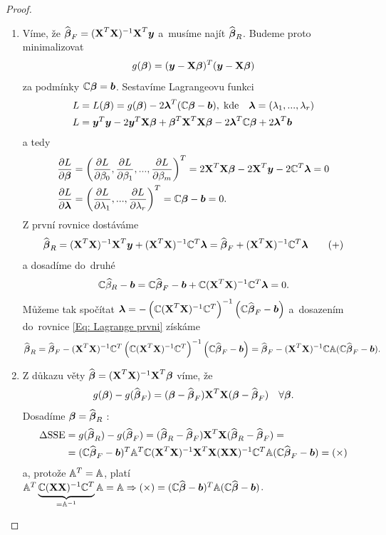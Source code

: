 \begin{proof}
\begin{enumerate}
\item
Víme, že $\wbetab_F = \xtx \X^T \yb$ a~musíme najít $\wbetab_R$. Budeme proto minimalizovat
 $$
g(\betab) = (\yb - \X \betab)^T(\yb - \X \betab)
 $$
za podmínky $\C \betab = \bb$. Sestavíme Lagrangeovu funkci
\begin{align*}
L & = L(\betab) = g(\betab) - 2 \lambdab^T(\C \betab - \bb), \; \text{kde} \quad \lambdab = (\lambda_1,..., \lambda_r) \\
L & = \yb^T \yb - 2 \yb^T \X \betab + \betab^T \X^T \X \betab - 2 \lambdab^T \C \betab + 2 \lambdab^T \bb
\end{align*}
a tedy
\begin{align*}
\frac{\partial L}{\partial \betab} & = \left(\parcialni{L}{\beta_0}, \parcialni{L}{\beta_1},..., \parcialni{L}{\beta_m} \right)^T = 2 \X^T \X \betab - 2 \X^T \yb - 2 \C^T \lambdab = 0 \\
\parcialni{L}{\lambdab} & = \left(\parcialni{L}{\lambda_1},..., \parcialni{L}{\lambda_r} \right)^T = \C \betab - \bb = 0.
\end{align*}
Z první rovnice dostáváme
\begin{equation}
\wbetab_R = \xtx \X^T \yb + \xtx \C^T \lambdab = \wbetab_F + \xtx \C^T \lambdab \tag{+} \label{Eq: Lagrange prvni}
\end{equation}
a dosadíme do~druhé
 $$
\C \wbeta_R - \bb = \C \wbetab_F - \bb + \C \xtx \C^T \lambdab = 0.
 $$
Můžeme tak spočítat $\lambdab = -\left(\C \xtx \C^T\right)^{-1} \left(\C \wbetab_F - \bb \right)$ a~dosazením do~rovnice \eqref{Eq: Lagrange prvni} získáme
 $$
\wbetab_R = \wbetab_F - \xtx \C^T \left(\C \xtx \C^T \right)^{-1} \left(\C \wbetab_F - \bb \right) = \wbetab_F - \xtx \C \Am (\C \wbetab_F - \bb).
 $$

\item
Z důkazu věty $\wbetab = \xtx \X^T \betab$ víme, že
 $$
g(\betab) - g(\wbetab_F) = (\betab - \wbetab_F) \X^T \X (\betab - \wbetab_F) \quad \forall \betab.
 $$
Dosadíme $\betab = \wbetab_R$ :
\begin{align*}
	\Delta \SSE & = g(\wbetab_R) - g(\wbetab_F) = (\wbetab_R - \wbetab_F) \X^T \X (\wbetab_R - \wbetab_F) = \\
	& = (\C \wbetab_F - \bb)^T \Am^T \C \xtx \X^T \X (\X \X)^{-1} \C^T \Am (\C \wbetab_F - \bb) = (\times)
\end{align*}
a, protože $\Am^T = \Am$, platí $\Am^T\underbrace{\C (\X \X)^{-1} \C^T}_{ = \Am^{-1}} \Am = \Am \Rightarrow (\times) = (\C \wbetab - \bb)^T \Am (\C \wbetab - \bb)$.

\end{enumerate}
\end{proof}

